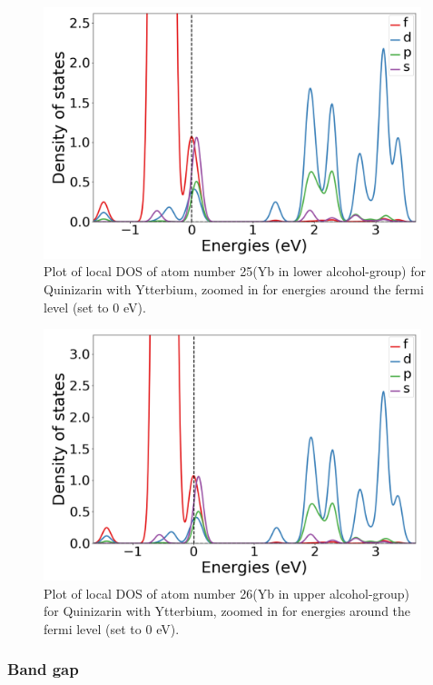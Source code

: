\documentclass{article}
\begin{document}
      \begin{figure}[H]
          \centering
          \includegraphics[width = 11cm]{../fig/Yb_LDOS25_3.png}
          \caption{Plot of local DOS of atom number 25(Yb in lower alcohol-group) for Quinizarin with Ytterbium, zoomed in for energies around the fermi level (set to 0 eV). }
          \label{fig:Yb_LDOS25_3}
      \end{figure}

      \begin{figure}[H]
          \centering
          \includegraphics[width = 11cm]{../fig/Yb_LDOS26_3.png}
          \caption{Plot of local DOS of atom number 26(Yb in upper alcohol-group) for Quinizarin with Ytterbium, zoomed in for energies around the fermi level (set to 0 eV). }
          \label{fig:Yb_LDOS26_3}
      \end{figure}

      \vspace{1cm}

    \subsubsection{Band gap}
\end{document}

